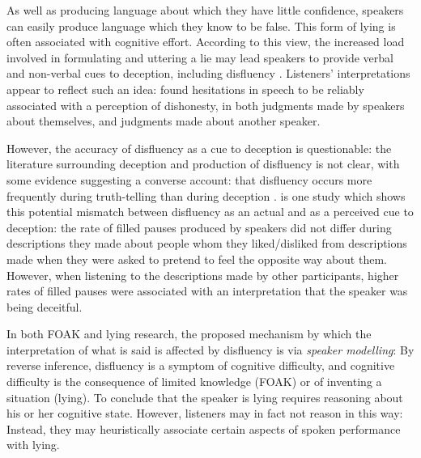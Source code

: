 \documentclass[a4paper,man,natbib]{apa6}
\newcommand*{\term}[1]{\emph{#1}} %
\begin{document}
As well as producing language about which they have little confidence, speakers can easily produce language which they know to be false.
This form of lying \citep[see][for another]{frankfurt05} is often associated with cognitive effort.
According to this view, the increased load involved in formulating and uttering a lie may lead speakers to provide verbal and non-verbal cues to deception, including disfluency \citep{Zuckerman1981,depaulo2003cues}.
Listeners' interpretations appear to reflect such an idea: \citet{Zuckerman1981} found hesitations in speech to be reliably associated with a perception of dishonesty, in both judgments made by speakers about themselves, and judgments made about another speaker.


However, the accuracy of disfluency as a cue to deception is questionable: the literature surrounding deception and production of disfluency is not clear, with some evidence suggesting a converse account: that disfluency occurs more frequently during truth-telling than during deception \citet{Arciuli2010markers, Arciuli2009lies, Benus2006pauses}.
\citet{DePaulo1982actual} is one study which shows this potential mismatch between disfluency as an actual and as a perceived cue to deception:
the rate of filled pauses produced by speakers did not differ during descriptions they made about people whom they liked/disliked from descriptions made when they were asked to pretend to feel the opposite way about them. 
However, when listening to the descriptions made by other participants, higher rates of filled pauses were associated with an interpretation that the speaker was being deceitful.


In both FOAK and lying research, the proposed mechanism by which the interpretation of what is said is affected by disfluency is via \term{speaker modelling}:
By reverse inference, disfluency is a symptom of cognitive difficulty, and cognitive difficulty is the consequence of limited knowledge (FOAK) or of inventing a situation (lying).
To conclude that the speaker is lying requires reasoning about his or her cognitive state.
However, listeners may in fact not reason in this way:
Instead, they may heuristically associate certain aspects of spoken performance with lying.
\end{document}
